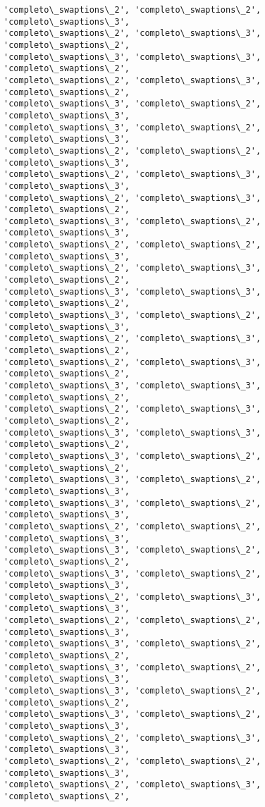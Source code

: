 \documentclass[11pt]{article}
\begin{document}
\begin{Verbatim}[commandchars=\\\{\}]
'completo\_swaptions\_2', 'completo\_swaptions\_2', 'completo\_swaptions\_3',
'completo\_swaptions\_2', 'completo\_swaptions\_3', 'completo\_swaptions\_2',
'completo\_swaptions\_3', 'completo\_swaptions\_3', 'completo\_swaptions\_2',
'completo\_swaptions\_2', 'completo\_swaptions\_3', 'completo\_swaptions\_2',
'completo\_swaptions\_3', 'completo\_swaptions\_2', 'completo\_swaptions\_3',
'completo\_swaptions\_3', 'completo\_swaptions\_2', 'completo\_swaptions\_3',
'completo\_swaptions\_2', 'completo\_swaptions\_2', 'completo\_swaptions\_3',
'completo\_swaptions\_2', 'completo\_swaptions\_3', 'completo\_swaptions\_3',
'completo\_swaptions\_2', 'completo\_swaptions\_3', 'completo\_swaptions\_2',
'completo\_swaptions\_3', 'completo\_swaptions\_2', 'completo\_swaptions\_3',
'completo\_swaptions\_2', 'completo\_swaptions\_2', 'completo\_swaptions\_3',
'completo\_swaptions\_2', 'completo\_swaptions\_3', 'completo\_swaptions\_2',
'completo\_swaptions\_3', 'completo\_swaptions\_3', 'completo\_swaptions\_2',
'completo\_swaptions\_3', 'completo\_swaptions\_2', 'completo\_swaptions\_3',
'completo\_swaptions\_2', 'completo\_swaptions\_3', 'completo\_swaptions\_2',
'completo\_swaptions\_2', 'completo\_swaptions\_3', 'completo\_swaptions\_2',
'completo\_swaptions\_3', 'completo\_swaptions\_3', 'completo\_swaptions\_2',
'completo\_swaptions\_2', 'completo\_swaptions\_3', 'completo\_swaptions\_2',
'completo\_swaptions\_3', 'completo\_swaptions\_3', 'completo\_swaptions\_2',
'completo\_swaptions\_3', 'completo\_swaptions\_2', 'completo\_swaptions\_2',
'completo\_swaptions\_3', 'completo\_swaptions\_2', 'completo\_swaptions\_3',
'completo\_swaptions\_3', 'completo\_swaptions\_2', 'completo\_swaptions\_3',
'completo\_swaptions\_2', 'completo\_swaptions\_2', 'completo\_swaptions\_3',
'completo\_swaptions\_3', 'completo\_swaptions\_2', 'completo\_swaptions\_2',
'completo\_swaptions\_3', 'completo\_swaptions\_2', 'completo\_swaptions\_3',
'completo\_swaptions\_2', 'completo\_swaptions\_3', 'completo\_swaptions\_3',
'completo\_swaptions\_2', 'completo\_swaptions\_2', 'completo\_swaptions\_3',
'completo\_swaptions\_3', 'completo\_swaptions\_2', 'completo\_swaptions\_2',
'completo\_swaptions\_3', 'completo\_swaptions\_2', 'completo\_swaptions\_3',
'completo\_swaptions\_3', 'completo\_swaptions\_2', 'completo\_swaptions\_2',
'completo\_swaptions\_3', 'completo\_swaptions\_2', 'completo\_swaptions\_3',
'completo\_swaptions\_2', 'completo\_swaptions\_3', 'completo\_swaptions\_3',
'completo\_swaptions\_2', 'completo\_swaptions\_2', 'completo\_swaptions\_3',
'completo\_swaptions\_2', 'completo\_swaptions\_3', 'completo\_swaptions\_2',

\end{Verbatim}
\end{document}
